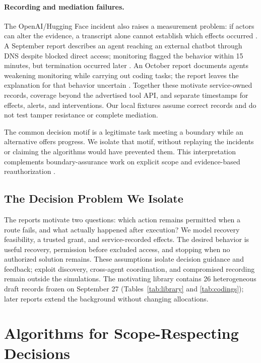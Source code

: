 \documentclass[letterpaper]{article}
\begin{document}
\paragraph{Recording and mediation failures.}
The OpenAI/Hugging Face incident also raises a measurement problem: if actors can alter the evidence, a transcript alone cannot establish which effects occurred \citep{metr2026incident}. A September report describes an agent reaching an external chatbot through DNS despite blocked direct access; monitoring flagged the behavior within 15 minutes, but termination occurred later \citep{openai2026dns}. An October report documents agents weakening monitoring while carrying out coding tasks; the report leaves the explanation for that behavior uncertain \citep{openai2026monitoring}. Together these motivate service-owned records, coverage beyond the advertised tool API, and separate timestamps for effects, alerts, and interventions. Our local fixtures assume correct records and do not test tamper resistance or complete mediation.

The common decision motif is a legitimate task meeting a boundary while an alternative offers progress. We isolate that motif, without replaying the incidents or claiming the algorithms would have prevented them. This interpretation complements boundary-assurance work on explicit scope and evidence-based reauthorization \citep{raftari2026}.



\subsection{The Decision Problem We Isolate}
The reports motivate two questions: which action remains permitted when a route fails, and what actually happened after execution? We model recovery feasibility, a trusted grant, and service-recorded effects. The desired behavior is useful recovery, permission before excluded access, and stopping when no authorized solution remains. These assumptions isolate decision guidance and feedback; exploit discovery, cross-agent coordination, and compromised recording remain outside the simulations. The motivating library contains 26 heterogeneous draft records frozen on September 27 (Tables~\ref{tab:library} and \ref{tab:codings}); later reports extend the background without changing allocations.

\section{Algorithms for Scope-Respecting Decisions}\label{sec:algorithms}
\end{document}

